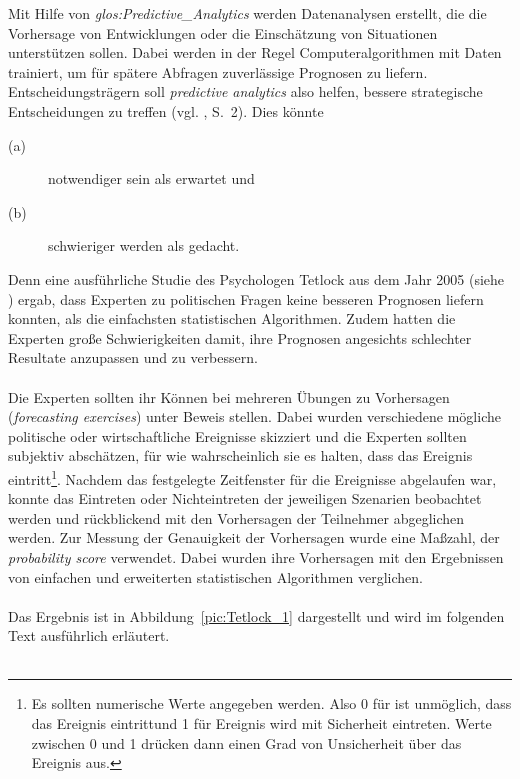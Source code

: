 Mit Hilfe von \emph{\gls{glos:Predictive_Analytics}} werden Datenanalysen
erstellt, die die Vorhersage von Entwicklungen oder die Einschätzung von
Situationen unterstützen sollen. Dabei werden in der Regel Computeralgorithmen
mit Daten trainiert, um für spätere Abfragen zuverlässige Prognosen zu liefern.
Entscheidungsträgern soll \emph{predictive analytics} also helfen, bessere
strategische Entscheidungen zu treffen (vgl. \cite{Mauerer}, S.~2). %
Dies könnte
\begin{description}
\item[(a)] notwendiger sein als erwartet und
\item[(b)] schwieriger werden als gedacht.
\end{description}
Denn eine ausführliche Studie des Psychologen \xcom Tetlock aus dem Jahr 2005
(siehe \cite{Tetlock}) ergab,
dass Experten zu politischen Fragen keine besseren Prognosen liefern konnten,
als die einfachsten statistischen Algorithmen. Zudem hatten die Experten
große Schwierigkeiten damit, ihre Prognosen angesichts schlechter Resultate
anzupassen und zu verbessern. \\ \\
Die Experten sollten ihr Können bei mehreren Übungen zu Vorhersagen
(\emph{forecasting exercises}) unter Beweis stellen. Dabei wurden verschiedene
mögliche politische oder wirtschaftliche Ereignisse skizziert und die Experten
sollten subjektiv abschätzen, für wie wahrscheinlich sie es halten, dass das
Ereignis eintritt\footnote{Es sollten numerische Werte angegeben werden. Also
0 für  ist unmöglich, dass das Ereignis eintritt\grqq und 1 für
 Ereignis wird mit Sicherheit eintreten\grqq. Werte zwischen 0 und 1
drücken dann einen Grad von Unsicherheit über das Ereignis aus.}.
Nachdem das festgelegte Zeitfenster für die Ereignisse abgelaufen war, konnte
das Eintreten oder Nichteintreten der jeweiligen Szenarien beobachtet werden und
rückblickend mit den Vorhersagen der Teilnehmer abgeglichen werden.  
Zur Messung der Genauigkeit der Vorhersagen wurde eine Maßzahl,
der \emph{probability score} verwendet. Dabei wurden ihre Vorhersagen mit den
Ergebnissen von einfachen und erweiterten statistischen Algorithmen
verglichen. \\ \\
Das Ergebnis ist in Abbildung~\ref{pic:Tetlock_1} dargestellt und wird im
folgenden Text ausführlich erläutert. \\ \\
